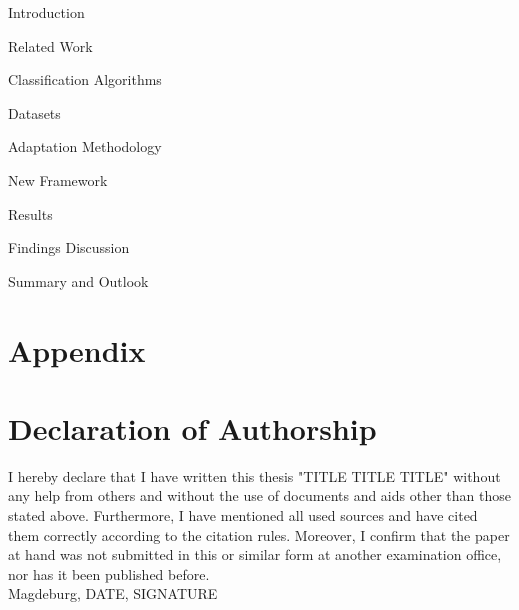 \renewcommand*\contentsname{Table of Contents}
\tableofcontents
\thispagestyle{empty}
 
 \null\newpage
{} 






\thispagestyle{empty}
\null\newpage
{}
{Introduction}
\null\newpage

{Related Work}
\null\newpage

{Classification Algorithms}
\null\newpage

{Datasets}
\null\newpage

{Adaptation Methodology}
\null\newpage

{New Framework}
\null\newpage

{Results}
\null\newpage

{Findings Discussion}
\null\newpage

{Summary and Outlook}

\section{Appendix}

\null\newpage

% 
\printbibliography
\newpage

\section{Declaration of Authorship}
I hereby declare that I have written this thesis "TITLE TITLE TITLE"
without any help from others and without the use of documents and aids
other than those stated above. Furthermore, I have mentioned all used
sources and have cited them correctly according to the citation rules.
Moreover, I confirm that the paper at hand was not submitted in this or
similar form at another examination office, nor has it been published
before.
\\
Magdeburg, DATE, SIGNATURE